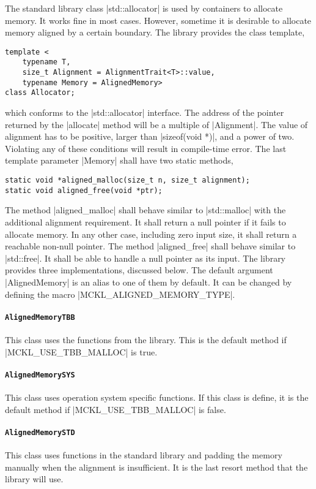 The standard library class |std::allocator| is used by containers to allocate
memory. It works fine in most cases. However, sometime it is desirable to
allocate memory aligned by a certain boundary. The library provides the class
template,
\begin{verbatim}
template <
    typename T,
    size_t Alignment = AlignmentTrait<T>::value,
    typename Memory = AlignedMemory>
class Allocator;
\end{verbatim}
which conforms to the |std::allocator| interface. The address of the pointer
returned by the |allocate| method will be a multiple of |Alignment|. The value
of alignment has to be positive, larger than |sizeof(void *)|, and a power of
two. Violating any of these conditions will result in compile-time error. The
last template parameter |Memory| shall have two static methods,
\begin{verbatim}
static void *aligned_malloc(size_t n, size_t alignment);
static void aligned_free(void *ptr);
\end{verbatim}
The method |aligned_malloc| shall behave similar to |std::malloc| with the
additional alignment requirement. It shall return a null pointer if it fails to
allocate memory. In any other case, including zero input size, it shall return
a reachable non-null pointer. The method |aligned_free| shall behave similar to
|std::free|. It shall be able to handle a null pointer as its input. The
library provides three implementations, discussed below. The default argument
|AlignedMemory| is an alias to one of them by default. It can be changed by
defining the macro |MCKL_ALIGNED_MEMORY_TYPE|.

\paragraph{\texttt{AlignedMemoryTBB}} This class uses the functions from the
\tbb library. This is the default method if |MCKL_USE_TBB_MALLOC| is true.

\paragraph{\texttt{AlignedMemorySYS}} This class uses operation system specific
functions. If this class is define, it is the default method if
|MCKL_USE_TBB_MALLOC| is false.

\paragraph{\texttt{AlignedMemorySTD}} This class uses functions in the standard
library and padding the memory manually when the alignment is insufficient. It
is the last resort method that the library will use.

